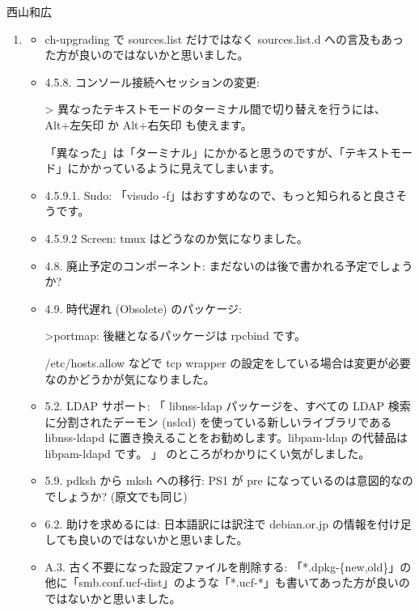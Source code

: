 \documentclass[mingoth,a4paper]{jsarticle}
\begin{document}
\clearpage

\begin{prework}{ 西山和広 }
  \begin{enumerate}
  \item
    \begin{itemize}
    \item %
      ch-upgrading で sources.list だけではなく sources.list.d への言及もあった方が良いのではないかと思いました。
    \item %
      4.5.8. コンソール接続へセッションの変更:
      \begin{commandline}
        > 異なったテキストモードのターミナル間で切り替えを行うには、Alt+左矢印 か Alt+右矢印 も使えます。
      \end{commandline}
      \noindent
      「異なった」は「ターミナル」にかかると思うのですが、「テキストモード」にかかっているように見えてしまいます。
    \item %
      4.5.9.1. Sudo:
      「visudo -f」はおすすめなので、もっと知られると良さそうです。
    \item %
      4.5.9.2 Screen:
      tmux はどうなのか気になりました。
    \item %
      4.8. 廃止予定のコンポーネント:
      まだないのは後で書かれる予定でしょうか?
    \item %
      4.9. 時代遅れ (Obsolete) のパッケージ:
      \begin{commandline}
        >portmap: 後継となるパッケージは rpcbind です。
      \end{commandline}
      \noindent
      /etc/hosts.allow などで tcp wrapper の設定をしている場合は変更が必要なのかどうかが気になりました。
    \item %
      5.2. LDAP サポート:
      「 libnss-ldap パッケージを、すべての LDAP 検索に分割されたデーモン (nslcd) を使っている新しいライブラリである libnss-ldapd に置き換えることをお勧めします。libpam-ldap の代替品は libpam-ldapd です。 」
      のところがわかりにくい気がしました。
    \item %
      5.9. pdksh から mksh への移行:
      PS1 が pre になっているのは意図的なのでしょうか? (原文でも同じ)
    \item %
      6.2. 助けを求めるには:
      日本語訳には訳注で debian.or.jp の情報を付け足しても良いのではないかと思いました。
    \item %
      A.3. 古く不要になった設定ファイルを削除する:
      「*.dpkg-\{new,old\}」の他に「smb.conf.ucf-dist」のような「*.ucf-*」も書いてあった方が良いのではないかと思いました。
    \end{itemize}

\end{enumerate}
\end{prework}
\end{document}

